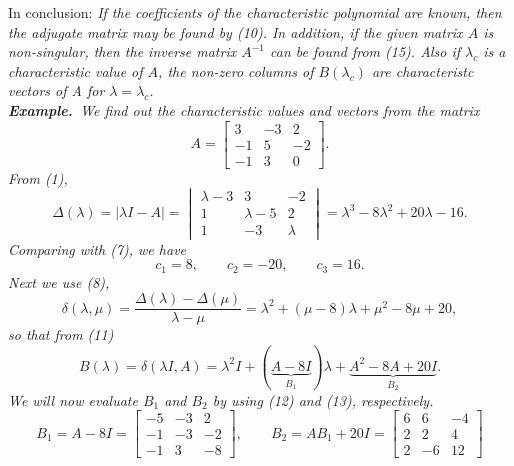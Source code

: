 \documentclass[12pt]{article}
\begin{document}
In conclusion: {\em If the coefficients of the characteristic polynomial are known, then the adjugate matrix may be found by (10). In addition, if the given matrix $A$ is non-singular, then the inverse matrix $A^{-1}$ can be found from (15). Also if $\lambda_c$ is a characteristic value of $A$, the non-zero columns of $B(\lambda_c)$ are characteristc vectors of A for $\lambda=\lambda_c$. \\

\textbf{Example.}\, We find out the characteristic values and vectors from the matrix
\begin{equation*}
A=
\begin{bmatrix}
3 & -3 & 2 \\
-1 & 5 & -2 \\
-1 & 3 & 0
\end{bmatrix}
.
\end{equation*}
From (1),
\begin{equation*}
\Delta(\lambda)=|\lambda I-A|=
\begin{vmatrix}
\lambda-3 & 3 & -2 \\
1 & \lambda-5 & 2 \\
1 & -3 & \lambda
\end{vmatrix}
=\lambda^3-8\lambda^2+20\lambda-16.
\end{equation*}
Comparing with (7), we have
\begin{equation*}
c_1=8, \qquad c_2=-20, \qquad c_3=16.
\end{equation*}
Next we use (8),
\begin{equation*}
\delta(\lambda,\mu)=\frac{\Delta(\lambda)-\Delta(\mu)}{\lambda-\mu}=\lambda^2+(\mu-8)\lambda+\mu^2-8\mu+20,
\end{equation*}
so that from (11)
\begin{equation*}
B(\lambda)=\delta(\lambda I,A)=\lambda^2 I+(\underbrace{A-8I}_{B_1})\lambda+\underbrace{A^2-8A+20I}_{B_2}.
\end{equation*}
We will now evaluate $B_1$ and $B_2$ by using (12) and (13), respectively.
\begin{equation*}
B_1=A-8I=
\begin{bmatrix}
-5 & -3 & 2 \\
-1 & -3 & -2 \\
-1 & 3 & -8
\end{bmatrix}
, \qquad
B_2=AB_1+20I=
\begin{bmatrix}
6 & 6 & -4 \\
2 & 2 & 4 \\
2 & -6 & 12
\end{bmatrix}

\end{equation*}}
\end{document}
